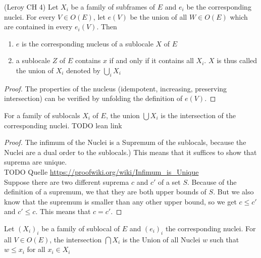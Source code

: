 \begin{lemma}
(Leroy CH 4)
    \label{lem:sublocal_union}
    \leanok
    Let $X_i$ be a family of subframes of $E$ and $e_i$ be the corresponding nuclei. For every $V \in O(E)$, let
    $e(V)$ be the union of all $W \in O(E)$ which are contained in every $e_i(V)$. Then \\
    \begin{enumerate}
        \item $e$ is the corresponding nucleus of a sublocale $X$ of $E$
        \item a sublocale $Z$ of $E$ contains $x$ if and only if it contains all $X_i$. $X$ is thus called the union of
        $X_i$ denoted by $\bigcup_i X_i$
    \end{enumerate}
\end{lemma}
\begin{proof}
    The properties of the nucleus (idempotent, increasing, preserving intersection) can be verified by unfolding the
    definition of $e(V)$.
    \leanok
\end{proof}

\begin{lemma}
    \label{lem:sublocal_union_nucleus_intersection}
    \leanok
    For a family of sublocals $X_i$ of $E$, the union $\bigcup X_i$ is the intersection of the corresponding nuclei.
    TODO lean link
\end{lemma}
\begin{proof}
    The infimum of the Nuclei is a Supremum of the sublocals, because the Nuclei are a dual order to the sublocals.)
    This means that it suffices to show that suprema are unique. \\
    TODO Quelle \url{https://proofwiki.org/wiki/Infimum_is_Unique} \\
    Suppose there are two different suprema $c$ and $c'$ of a set $S$. Because of the definition of a supremum, we
    that they are both upper bounds of $S$. But we also know that the supremum is smaller than any other upper bound, so
    we get $c \le c'$ and $c' \le c$. This means that $c = c'$.
    \leanok

\end{proof}


\begin{definition}
    \label{def:sublocal_intersection}
    \leanok
    Let $(X_i)_i$ be a family of sublocal of $E$ and $(e_i)_i$ the corresponding nuclei.
    For all $V \in O(E)$, the intersection $\bigcap X_i$ is the Union of all Nuclei $w$ such that $w \le x_i $ for all $x_i \in X_i $
\end{definition}

